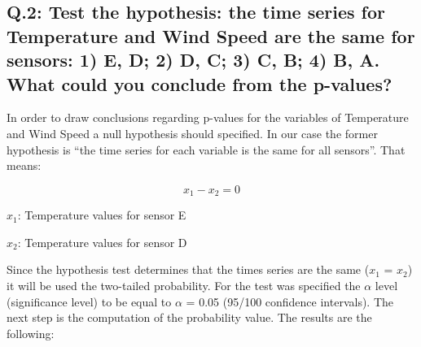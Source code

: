 \documentclass[a4paper]{article}
\begin{document}
        \subsection{Q.2: Test the hypothesis: the time series for Temperature and Wind Speed are the same for sensors: 1) E, D; 2) D, C; 3) C, B; 4) B, A.
        What could you conclude from the p-values?}
    
            In order to draw conclusions regarding p-values for the variables of Temperature and Wind Speed a null hypothesis should specified. In our case the former hypothesis is “the time series for each variable is the same for all sensors”. That means:
            
            
                    \begin{equation}
                             x_1 - x_2 = 0
                    \end{equation}
                            
            $x_1$: Temperature values for sensor E

            $x_2$: Temperature values for sensor D

            Since the hypothesis test determines that the times series are the same ($x_1$ = $x_2$) it will be used the two-tailed probability. For the test was specified the $\alpha$ level (significance level) to be equal to $\alpha $ = 0.05 (95/100 confidence intervals). The next step is the computation of the probability value. The results are the following:
           
\end{document}

